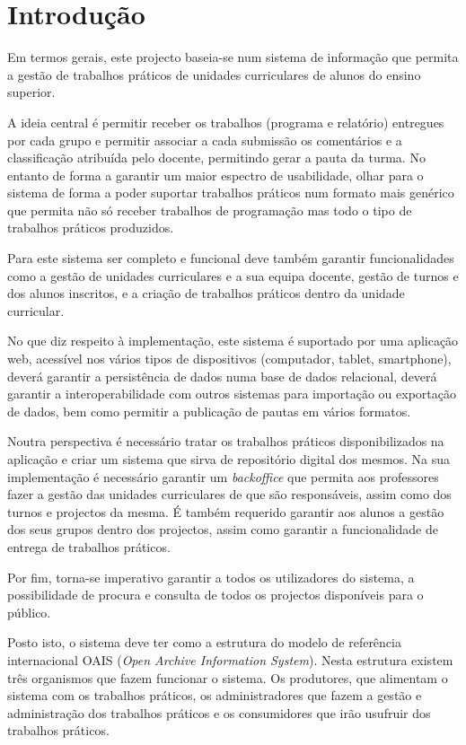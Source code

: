 \section{Introdução}
Em termos gerais, este projecto baseia-se num sistema de informação que permita a gestão de trabalhos 
práticos de unidades curriculares de alunos do ensino superior.

A ideia central é permitir receber os trabalhos (programa e relatório) entregues por cada grupo e 
permitir associar a cada submissão os comentários e a classificação atribuída pelo docente, 
permitindo gerar a pauta da turma. No entanto de forma a garantir um maior 
espectro de usabilidade, olhar para o sistema de forma a poder suportar 
trabalhos práticos num formato mais genérico que permita não só receber 
trabalhos de programação mas todo o tipo de trabalhos práticos produzidos.

Para este sistema ser completo e funcional deve também garantir funcionalidades como
a gestão de unidades curriculares e a sua equipa docente,  gestão de turnos e dos alunos inscritos, e a
criação de trabalhos práticos dentro da unidade curricular.

No que diz respeito à implementação, este sistema é suportado por uma aplicação web, acessível
nos vários tipos de dispositivos (computador, tablet, smartphone), deverá garantir a persistência de 
dados numa base de dados relacional, deverá garantir a interoperabilidade com outros sistemas para
importação ou exportação de dados, bem como permitir a publicação de pautas em vários formatos.

Noutra perspectiva é necessário tratar os trabalhos práticos disponibilizados na aplicação
e criar um sistema que sirva de repositório digital dos mesmos. Na sua implementação é necessário
garantir um \textit{backoffice} que permita aos professores fazer a gestão das unidades curriculares
de que são responsáveis, assim como dos turnos e projectos da mesma. É também requerido garantir
aos alunos a gestão dos seus grupos dentro dos projectos, assim como garantir a funcionalidade
de entrega de trabalhos práticos.
 
 Por fim, torna-se imperativo garantir a todos os utilizadores do sistema, a possibilidade de procura
 e consulta de todos os projectos disponíveis para o público.
 
 Posto isto, o sistema deve ter como a estrutura do modelo de referência internacional OAIS 
 (\textit{Open Archive Information System}).
 Nesta estrutura existem três organismos que fazem funcionar o sistema. Os produtores, que 
 alimentam o sistema com os trabalhos práticos, os administradores que fazem a gestão e administração
 dos trabalhos práticos e os consumidores que irão usufruir dos trabalhos práticos. 
 
